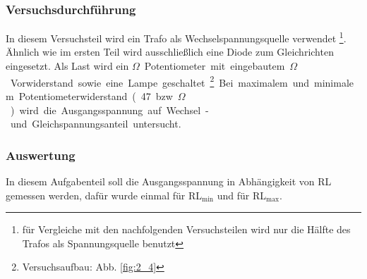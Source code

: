 \documentclass[12pt,a4paper]{article}
\begin{document}
\subsubsection{Versuchsdurchführung}
In diesem Versuchsteil wird ein Trafo als Wechselspannungsquelle verwendet \footnote{für Vergleiche mit den nachfolgenden Versuchsteilen wird nur die Hälfte des Trafos als Spannungsquelle benutzt}. Ähnlich wie im ersten Teil wird ausschließlich eine Diode zum Gleichrichten eingesetzt. Als Last wird ein \unit[470]{$\Omega$}Potentiometer mit eingebautem \unit[47]{$\Omega$} Vorwiderstand sowie eine Lampe geschaltet \footnote{Versuchsaufbau: Abb. \ref{fig:2_4}}. Bei maximalem und minimalem Potentiometerwiderstand (47 bzw. \unit[517]{$\Omega$}) wird die Ausgangsspannung auf Wechsel- und Gleichspannungsanteil untersucht.
\subsubsection{Auswertung}

In diesem Aufgabenteil soll die Ausgangsspannung in Abhängigkeit von RL gemessen werden, dafür wurde einmal für RL$_\text{min}$ und für RL$_\text{max}$.
\end{document}
